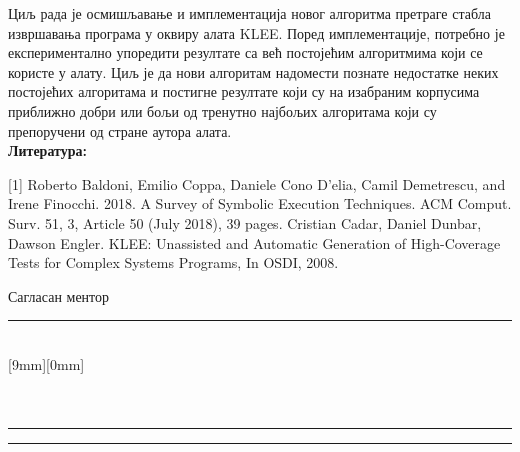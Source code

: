 \documentclass[a4paper]{article}
\begin{document}
\begin{flushleft}
{\begin{minipage}[t][12.2cm]{18cm}

Циљ рада је осмишљавање и имплементација новог алгоритма претраге стабла извршавања програма у оквиру алата KLEE. Поред имплементације, потребно је експериментално упоредити резултате са већ постојећим алгоритмима који се користе у алату. Циљ је да нови алгоритам надомести  познате недостатке неких постојећих алгоритама и постигне резултате који су на изабраним корпусима приближно добри или бољи од тренутно најбољих алгоритама који су препоручени од стране аутора алата. \\

\textbf{Литература:}

[1] Roberto Baldoni, Emilio Coppa, Daniele Cono D’elia, Camil Demetrescu, and Irene Finocchi. 2018. A Survey of Symbolic Execution Techniques. ACM Comput. Surv. 51, 3, Article 50 (July 2018), 39 pages. \newline
[2] Cristian Cadar, Daniel Dunbar, Dawson Engler. KLEE: Unassisted and Automatic Generation of High-Coverage Tests for Complex Systems Programs, In OSDI, 2008. 
\end{minipage}
}
\end{flushleft}
\vspace{0.3cm}
Сагласан ментор  \\
\rule[4mm]{10cm}{.05mm} \hfill {} \\
\raisebox{1cm}%
[9mm][0mm]{} \\
\makebox[10cm]{ }\\
\vspace{-1cm}\\
\rule[2cm]{6.5cm}{.05mm} \hfill \rule[2cm]{6.5cm}{.05mm}\\
\vspace{-2.4cm}\\
\end{document}
